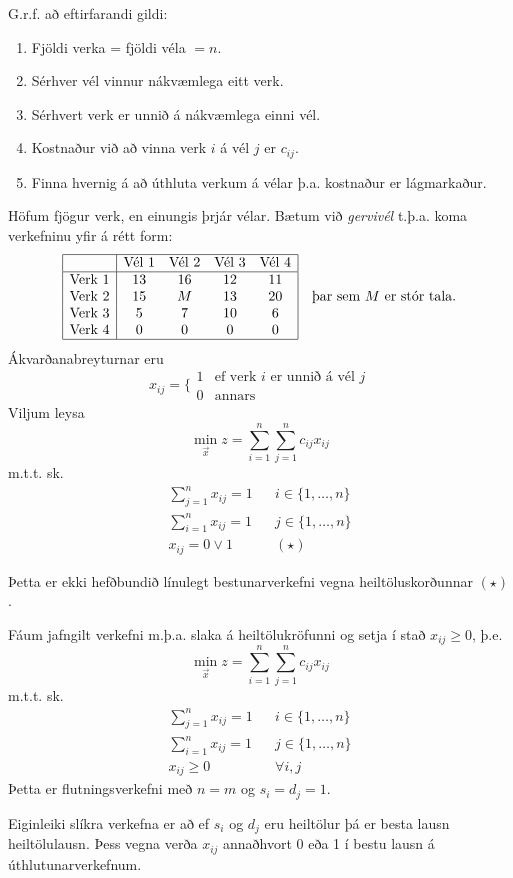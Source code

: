 \begin{samepage}
\begin{lausn}G.r.f. að eftirfarandi gildi:
\begin{enumerate}
 \item Fjöldi verka = fjöldi véla $=n$.
 \item Sérhver vél vinnur nákvæmlega eitt verk.
 \item Sérhvert verk er unnið á nákvæmlega einni vél.
 \item Kostnaður við að vinna verk $i$ á vél $j$ er $c_{ij}$.
 \item Finna hvernig á að úthluta verkum á vélar þ.a. kostnaður er lágmarkaður.
\end{enumerate}
Höfum fjögur verk, en einungis þrjár vélar. Bætum við \emph{gervivél} t.þ.a. koma verkefninu yfir á rétt form:
\[ \begin{array}{|l|cccc|} \hline &\textrm{Vél }1&\textrm{Vél }2&\textrm{Vél }3&\textrm{Vél }4\\ \hline
\textrm{Verk }1&13&16&12&11\\
\textrm{Verk }2&15&M&13&20\\
\textrm{Verk }3&5&7&10&6 \\ 
\textrm{Verk }4&0&0&0&0 \\ \hline
   \end{array}\quad\mbox{þar sem }M\textrm{ er stór tala.}\]
Ákvarðanabreyturnar eru 
$$ x_{ij}=\Big\{\begin{array}{cl} 1 & \textrm{ef verk }i\textrm{ er unnið á vél }j \\ 0 & \textrm{annars}\end{array}$$
Viljum leysa
$$ \min_{\vec{x}} z=\sum_{i=1}^n\sum_{j=1}^n c_{ij}x_{ij}$$
m.t.t. sk.
\begin{eqnarray*}
\sum_{j=1}^n x_{ij} = 1 && i\in\{1,\ldots,n\}\\
\sum_{i=1}^n x_{ij} = 1 && j\in\{1,\ldots,n\}\\ 
x_{ij}=0\vee 1 &&(\star)
\end{eqnarray*}
\begin{aths}Þetta er ekki hefðbundið línulegt bestunarverkefni vegna heiltöluskorðunnar $(\star)$.\end{aths}
Fáum jafngilt verkefni m.þ.a. slaka á heiltölukröfunni og setja í stað $x_{ij}\geq0$, þ.e.
$$ \min_{\vec{x}} z=\sum_{i=1}^n\sum_{j=1}^n c_{ij}x_{ij}$$
m.t.t. sk.
\begin{eqnarray*}
\sum_{j=1}^n x_{ij} = 1 && i\in\{1,\ldots,n\}\\
\sum_{i=1}^n x_{ij} = 1 && j\in\{1,\ldots,n\}\\ 
x_{ij}\geq 0 &&\forall i,j
\end{eqnarray*}
Þetta er flutningsverkefni með $n=m$ og $s_i=d_j=1$. 
\begin{aths}Eiginleiki slíkra verkefna er að ef $s_i$ og $d_j$ eru heiltölur þá er besta lausn heiltölulausn. Þess vegna verða $x_{ij}$ annaðhvort 0 eða 1 í bestu lausn á úthlutunarverkefnum.
\end{aths}
\end{lausn}
\end{samepage}

